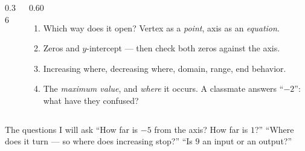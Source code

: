 \documentclass[aspectratio=169, 11pt]{beamer}
\newcommand{\lgrid}[4]{%
  \draw[step=1, linegray!40, very thin] (#1,#3) grid (#2,#4);
  \draw[->, thick, charcoal] (#1,0)--(#2,0) node[below right, font=\tiny]{$x$};
  \draw[->, thick, charcoal] (0,#3)--(0,#4) node[left, font=\tiny]{$y$};}
\newcommand{\fdot}[3]{\fill[#1] (#2,#3) circle (3.0pt);}
\begin{document}
\begin{frame}[t, plain]
  \begin{columns}[T]
    \begin{column}{0.36\textwidth}
      \centering
    \end{column}
    \begin{column}{0.60\textwidth}
      \begin{enumerate}\setlength{\itemsep}{3pt}
        \item[\textbf{10.}] Which way does it open? Vertex as a \emph{point}, axis as an
              \emph{equation}.
        \item[\textbf{11.}] Zeros and $y$-intercept --- then check both zeros against the axis.
        \item[\textbf{12.}] Increasing where, decreasing where, domain, range, end behavior.
        \item[\textbf{13.}] The \emph{maximum value}, and \emph{where} it occurs. A classmate
              answers ``$-2$'': what have they confused?
      \end{enumerate}
    \end{column}
  \end{columns}
  \vspace{2pt}
  \begin{block}{The questions I will ask}
    ``How far is $-5$ from the axis? How far is $1$?'' \quad ``Where does it turn --- so where
    does increasing stop?'' \quad ``Is $9$ an input or an output?''
  \end{block}
\end{frame}
\end{document}
